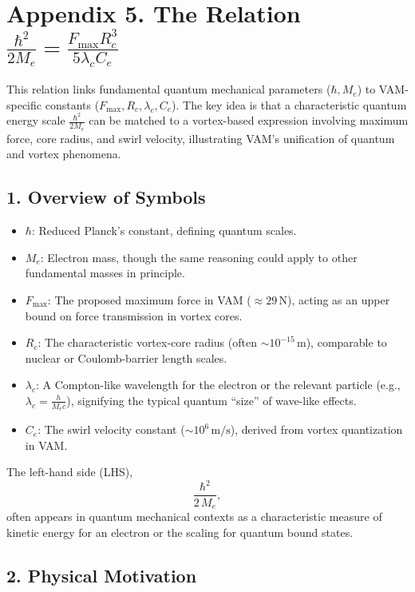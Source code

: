

\section*{Appendix 5. The Relation \(\frac{\hbar^2}{2 M_e} = \frac{F_{\text{max}} R_c^3}{5  \lambda_c  C_e} \)}

This relation links fundamental quantum mechanical parameters (\(\hbar, M_e\)) to VAM-specific constants (\(F_{\max}, R_c, \lambda_c, C_e\)). The key idea is that a characteristic quantum energy scale \(\tfrac{\hbar^2}{2M_e}\) can be matched to a vortex-based expression involving maximum force, core radius, and swirl velocity, illustrating VAM’s unification of quantum and vortex phenomena.

\subsection*{1. Overview of Symbols}

\begin{itemize}
    \item \(\hbar\): Reduced Planck’s constant, defining quantum scales.
    \item \(M_e\): Electron mass, though the same reasoning could apply to other fundamental masses in principle.
    \item \(F_{\text{max}}\): The proposed maximum force in VAM (\(\approx 29\,\mathrm{N}\)), acting as an upper bound on force transmission in vortex cores.
    \item \(R_c\): The characteristic vortex-core radius (often \(\sim 10^{-15}\,\mathrm{m}\)), comparable to nuclear or Coulomb-barrier length scales.
    \item \(\lambda_c\): A Compton-like wavelength for the electron or the relevant particle (e.g., \(\lambda_c = \tfrac{h}{M_e c}\)), signifying the typical quantum “size” of wave-like effects.
    \item \(C_e\): The swirl velocity constant (\(\sim 10^6\,\mathrm{m/s}\)), derived from vortex quantization in VAM.
\end{itemize}

The left-hand side (LHS),
\[
    \frac{\hbar^2}{2\,M_e},
\]
often appears in quantum mechanical contexts as a characteristic measure of kinetic energy for an electron or the scaling for quantum bound states.

\subsection*{2. Physical Motivation}

